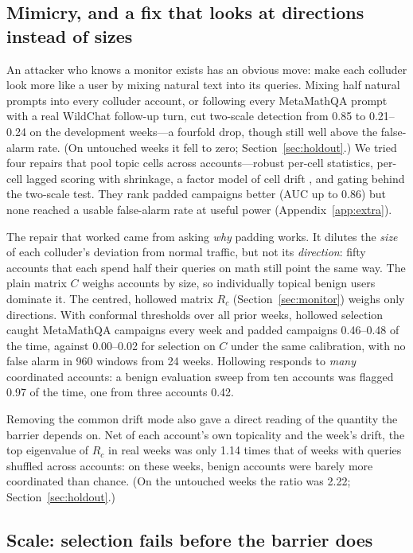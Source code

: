 \subsection{Mimicry, and a fix that looks at directions instead of sizes}
\label{sec:mimicry-full}

An attacker who knows a monitor exists has an obvious move: make each colluder look more like a user by mixing natural text into its queries. Mixing half natural prompts into every colluder account, or following every MetaMathQA prompt with a real WildChat follow-up turn, cut two-scale detection from 0.85 to 0.21--0.24 on the development weeks---a fourfold drop, though still well above the false-alarm rate. (On untouched weeks it fell to zero; Section~\ref{sec:holdout}.) We tried four repairs that pool topic cells across accounts---robust per-cell statistics, per-cell lagged scoring with shrinkage, a factor model of cell drift \citep{bai2002determining,ahn2013eigenvalue}, and gating behind the two-scale test. They rank padded campaigns better (AUC up to 0.86) but none reached a usable false-alarm rate at useful power (Appendix~\ref{app:extra}).

The repair that worked came from asking \emph{why} padding works. It dilutes the \emph{size} of each colluder's deviation from normal traffic, but not its \emph{direction}: fifty accounts that each spend half their queries on math still point the same way. The plain matrix $C$ weighs accounts by size, so individually topical benign users dominate it. The centred, hollowed matrix $R_c$ (Section~\ref{sec:monitor}) weighs only directions. With conformal thresholds over all prior weeks, hollowed selection caught MetaMathQA campaigns every week and padded campaigns 0.46--0.48 of the time, against 0.00--0.02 for selection on $C$ under the same calibration, with no false alarm in 960 windows from 24 weeks. Hollowing responds to \emph{many} coordinated accounts: a benign evaluation sweep from ten accounts was flagged 0.97 of the time, one from three accounts 0.42.

Removing the common drift mode also gave a direct reading of the quantity the barrier depends on. Net of each account's own topicality and the week's drift, the top eigenvalue of $R_c$ in real weeks was only 1.14 times that of weeks with queries shuffled across accounts: on these weeks, benign accounts were barely more coordinated than chance. (On the untouched weeks the ratio was 2.22; Section~\ref{sec:holdout}.)

\subsection{Scale: selection fails before the barrier does}
\label{sec:scale-full}

